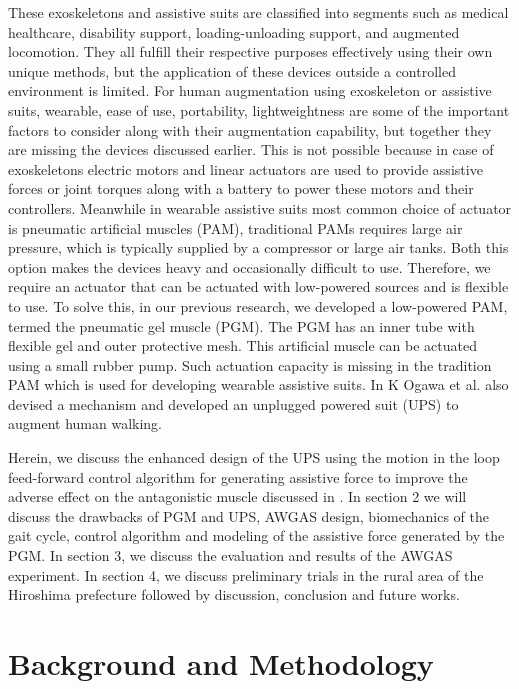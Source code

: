 \documentclass[paper,JRM,paper]{jaciiiarticle}
\begin{document}
These exoskeletons and assistive suits are classified into segments such as medical healthcare, disability support, loading-unloading support, and augmented locomotion. They all fulfill their respective purposes effectively using their own unique methods, but the application of these devices outside a controlled environment is limited. For human augmentation using exoskeleton or assistive suits, wearable, ease of use, portability, lightweightness are some of the important factors to consider along with their augmentation capability, but together they are missing the devices discussed earlier. This is not possible because in case of exoskeletons electric motors and linear actuators are used to provide assistive forces or joint torques along with a battery to power these motors and their controllers. Meanwhile in wearable assistive suits most common choice of actuator is pneumatic artificial muscles (PAM)\cite{10}, traditional PAMs requires large air pressure, which is typically supplied by a compressor or large air tanks. Both this option makes the devices heavy and occasionally difficult to use. Therefore, we require an actuator that can be actuated with low-powered sources and is flexible to use. To solve this, in our previous research\cite{11}, we developed a low-powered PAM, termed the pneumatic gel muscle (PGM). The PGM has an inner tube with flexible gel and outer protective mesh. This artificial muscle can be actuated using a small rubber pump. Such actuation capacity is missing in the tradition PAM which is used for developing wearable assistive suits. In \cite{11} K Ogawa et al. also devised a mechanism and developed an unplugged powered suit (UPS) to augment human walking. 

Herein, we discuss the enhanced design of the UPS using the motion in the loop feed-forward control algorithm for generating assistive force to improve the adverse effect on the antagonistic muscle discussed in \cite{11}. In section 2 we will discuss the drawbacks of PGM and UPS, AWGAS design, biomechanics of the gait cycle, control algorithm and modeling of the assistive force generated by the PGM. In section 3, we discuss the evaluation and results of the AWGAS experiment. In section 4, we discuss preliminary trials in the rural area of the Hiroshima prefecture followed by discussion, conclusion and future works.


\section{Background and Methodology}
\end{document}
